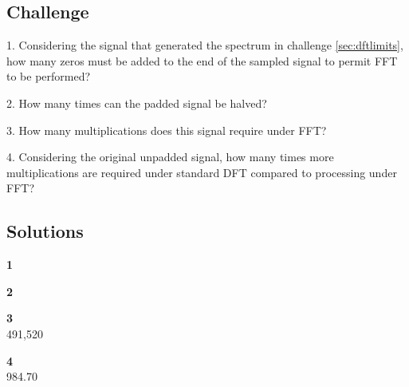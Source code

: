 \subsection*{Challenge}
1. Considering the signal that generated the spectrum in challenge \ref{sec:dftlimits}, how many zeros must be added to the end of the sampled signal to permit FFT to be performed?

2. How many times can the padded signal be halved?

3. How many multiplications does this signal require under FFT?

4. Considering the original unpadded signal, how many times more multiplications are required under standard DFT compared to processing under FFT?

\subsection*{Solutions}
\textbf{1}\\

\textbf{2}\\

\textbf{3}\\
491,520

\textbf{4}\\
984.70
